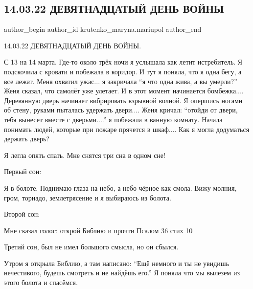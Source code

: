  
 
 
 
 

\subsection{14.03.22 ДЕВЯТНАДЦАТЫЙ ДЕНЬ ВОЙНЫ}
\label{sec:14_03_2023.fb.krutenko_maryna.mariupol.1.19_den_14_03}

\ifcmt
 author_begin
   author_id krutenko_maryna.mariupol
 author_end
\fi

14.03.22 ДЕВЯТНАДЦАТЫЙ ДЕНЬ ВОЙНЫ. 

С 13 на 14 марта. Где-то около трёх ночи я услышала как летит истребитель. Я
подскочила с кровати и побежала в коридор. И тут я поняла, что я одна бегу, а
все лежат. Меня охватил ужас... я закричала \enquote{я что одна жива, а вы умерли?} Женя
сказал, что самолёт уже улетает. И в этот момент начинается бомбежка....
Деревянную дверь начинает вибрировать взрывной волной. Я опершись ногами об
стену, руками пыталась удержать двери.... Женя кричал: \enquote{отойди от двери, тебя
вынесет вместе с дверьми....} я побежала в ванную комнату. Начала понимать людей,
которые при пожаре прячется в шкаф.... Как я могла додуматься держать дверь? 

Я легла опять спать. Мне снятся три сна в одном сне!

Первый сон:

Я в болоте. Поднимаю глаза на небо, а небо чёрное как смола. Вижу молния, гром,
торнадо, землетрясение и я выбираюсь из болота. 

Второй сон:

Мне сказал голос: открой Библию и прочти Псалом 36 стих 10

Третий сон, был не имел большого смысла, но он сбылся.

Утром я открыла Библию, а там написано: \enquote{Ещё немного и ты не увидишь
нечестивого, будешь смотреть и не найдёшь его.} Я поняла что мы вылезем из
этого болота и спасёмся. 

